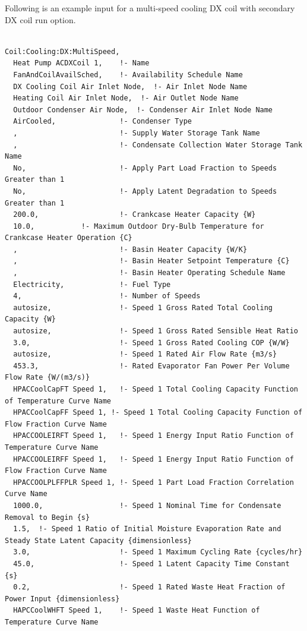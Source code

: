 Following is an example input for a multi-speed cooling DX coil with secondary DX coil run option.

\begin{lstlisting}

Coil:Cooling:DX:MultiSpeed,
  Heat Pump ACDXCoil 1,    !- Name
  FanAndCoilAvailSched,    !- Availability Schedule Name
  DX Cooling Coil Air Inlet Node,  !- Air Inlet Node Name
  Heating Coil Air Inlet Node,  !- Air Outlet Node Name
  Outdoor Condenser Air Node,  !- Condenser Air Inlet Node Name
  AirCooled,               !- Condenser Type
  ,                        !- Supply Water Storage Tank Name
  ,                        !- Condensate Collection Water Storage Tank Name
  No,                      !- Apply Part Load Fraction to Speeds Greater than 1
  No,                      !- Apply Latent Degradation to Speeds Greater than 1
  200.0,                   !- Crankcase Heater Capacity {W}
  10.0,           !- Maximum Outdoor Dry-Bulb Temperature for Crankcase Heater Operation {C}
  ,                        !- Basin Heater Capacity {W/K}
  ,                        !- Basin Heater Setpoint Temperature {C}
  ,                        !- Basin Heater Operating Schedule Name
  Electricity,             !- Fuel Type
  4,                       !- Number of Speeds
  autosize,                !- Speed 1 Gross Rated Total Cooling Capacity {W}
  autosize,                !- Speed 1 Gross Rated Sensible Heat Ratio
  3.0,                     !- Speed 1 Gross Rated Cooling COP {W/W}
  autosize,                !- Speed 1 Rated Air Flow Rate {m3/s}
  453.3,                   !- Rated Evaporator Fan Power Per Volume Flow Rate {W/(m3/s)}
  HPACCoolCapFT Speed 1,   !- Speed 1 Total Cooling Capacity Function of Temperature Curve Name
  HPACCoolCapFF Speed 1, !- Speed 1 Total Cooling Capacity Function of Flow Fraction Curve Name
  HPACCOOLEIRFT Speed 1,   !- Speed 1 Energy Input Ratio Function of Temperature Curve Name
  HPACCOOLEIRFF Speed 1,   !- Speed 1 Energy Input Ratio Function of Flow Fraction Curve Name
  HPACCOOLPLFFPLR Speed 1, !- Speed 1 Part Load Fraction Correlation Curve Name
  1000.0,                  !- Speed 1 Nominal Time for Condensate Removal to Begin {s}
  1.5,  !- Speed 1 Ratio of Initial Moisture Evaporation Rate and Steady State Latent Capacity {dimensionless}
  3.0,                     !- Speed 1 Maximum Cycling Rate {cycles/hr}
  45.0,                    !- Speed 1 Latent Capacity Time Constant {s}
  0.2,                     !- Speed 1 Rated Waste Heat Fraction of Power Input {dimensionless}
  HAPCCoolWHFT Speed 1,    !- Speed 1 Waste Heat Function of Temperature Curve Name

\end{lstlisting}
